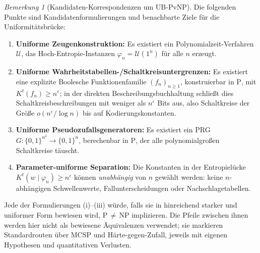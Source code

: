 \documentclass[aps,prd,twocolumn,superscriptaddress,nofootinbib]{revtex4-2}
\theoremstyle{definition}
\theoremstyle{remark}
\newtheorem{remark}[theorem]{Bemerkung}
\begin{document}
\begin{remark}[Kandidaten-Korrespondenzen um UB-PvNP]\label{rem:ub-equivalences}
Die folgenden Punkte sind Kandidatenformulierungen und benachbarte Ziele für die Uniformitätsbrücke:
\begin{enumerate}
\item[(i)] \textbf{Uniforme Zeugenkonstruktion:} Es existiert ein Polynomialzeit-Verfahren $\mathcal{U}$, das Hoch-Entropie-Instanzen $\varphi_n = \mathcal{U}(1^n)$ für alle $n$ erzeugt.
\item[(ii)] \textbf{Uniforme Wahrheitstabellen-/Schaltkreisuntergrenzen:} Es existiert eine explizite Boolesche Funktionenfamilie $(f_n)_{n \geq 1}$, konstruierbar in $\mathrm{P}$, mit $K^t(f_n) \geq n^\varepsilon$; in der direkten Beschreibungsbuchhaltung schließt dies Schaltkreisbeschreibungen mit weniger als $n^\varepsilon$ Bits aus, also Schaltkreise der Größe $o(n^\varepsilon/\log n)$ bis auf Kodierungskonstanten.
\item[(iii)] \textbf{Uniforme Pseudozufallsgeneratoren:} Es existiert ein PRG $G: \{0,1\}^{n^\delta} \to \{0,1\}^n$, berechenbar in $\mathrm{P}$, der alle polynomialgroßen Schaltkreise täuscht.
\item[(iv)] \textbf{Parameter-uniforme Separation:} Die Konstanten in der Entropielücke $K^t(w \mid \varphi_n) \geq n^\varepsilon$ können \emph{unabhängig} von $n$ gewählt werden: keine $n$-abhängigen Schwellenwerte, Fallunterscheidungen oder Nachschlagetabellen.
\end{enumerate}
Jede der Formulierungen (i)--(iii) würde, falls sie in hinreichend starker und uniformer Form bewiesen wird, P$\,\neq\,$NP implizieren. Die Pfeile zwischen ihnen werden hier nicht als bewiesene Äquivalenzen verwendet; sie markieren Standardrouten über MCSP und Härte-gegen-Zufall, jeweils mit eigenen Hypothesen und quantitativen Verlusten.
\end{remark}
\end{document}
